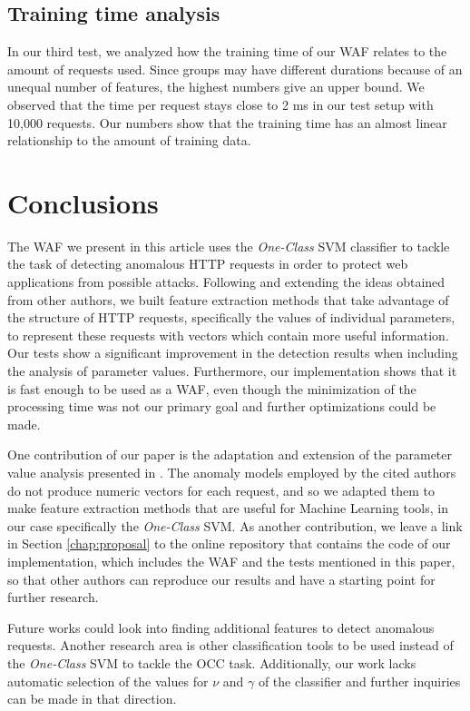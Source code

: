 \subsection{Training time analysis}

In our third test, we analyzed how the training time of our WAF relates
to the amount of requests used. Since groups may have different durations
because of an unequal number of features, the highest numbers give an
upper bound.
We observed that the time per request stays close to 2 ms in our test
setup with 10,000 requests. Our numbers show that the training time has
an almost linear relationship to the amount of training data.


\section{Conclusions}
\label{chap:conclusions}

The WAF we present in this article uses the \textit{One-Class} SVM
classifier to tackle the task of detecting anomalous HTTP requests in
order to protect web applications from possible attacks.
Following and extending the ideas obtained from other authors, we built
feature extraction methods that take advantage of the structure of HTTP
requests, specifically the values of individual parameters, to represent
these requests with vectors which contain more useful information.
Our tests show a significant improvement in the detection results when
including the analysis of parameter values.
Furthermore, our implementation shows that it is fast enough to be used
as a WAF, even though the minimization of the processing time was not
our primary goal and further optimizations could be made.

One contribution of our paper is the adaptation and extension of the
parameter value analysis presented in \cite{kruegel2003anomaly}. The
anomaly models employed by the cited authors do not produce numeric vectors
for each request, and so we adapted them to make feature extraction methods
that are useful for Machine Learning tools, in our case specifically the
\textit{One-Class} SVM.
As another contribution, we leave a link in Section \ref{chap:proposal}
to the online repository that contains the code of our implementation,
which includes the WAF and the tests mentioned in this paper, so that
other authors can reproduce our results and have a starting point for
further research.

Future works could look into finding additional features to detect anomalous
requests. Another research area is other classification tools to be used instead
of the \textit{One-Class} SVM to tackle the OCC task.
Additionally, our work lacks automatic selection of the
values for $\nu$ and $\gamma$ of the classifier and further inquiries
can be made in that direction.
